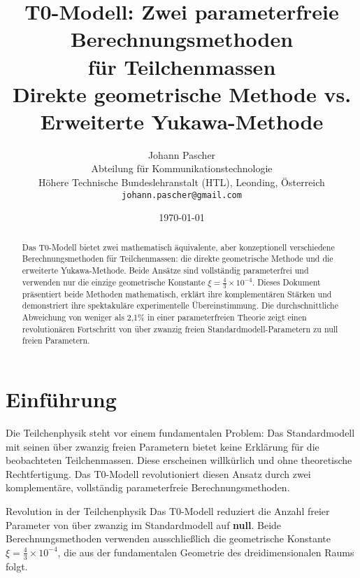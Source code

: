 \documentclass[12pt,a4paper]{article}
\newcommand{\xipar}{\xi}
\begin{document}
	
	\title{T0-Modell: Zwei parameterfreie Berechnungsmethoden \\
		für Teilchenmassen \\
		\large Direkte geometrische Methode vs. Erweiterte Yukawa-Methode}
	\author{Johann Pascher\\
		Abteilung für Kommunikationstechnologie\\
		Höhere Technische Bundeslehranstalt (HTL), Leonding, Österreich\\
		\texttt{johann.pascher@gmail.com}}
	\date{\today}
	
	\maketitle
	
	\begin{abstract}
		Das T0-Modell bietet zwei mathematisch äquivalente, aber konzeptionell verschiedene Berechnungsmethoden für Teilchenmassen: die direkte geometrische Methode und die erweiterte Yukawa-Methode. Beide Ansätze sind vollständig parameterfrei und verwenden nur die einzige geometrische Konstante $\xipar = \frac{4}{3} \times 10^{-4}$. Dieses Dokument präsentiert beide Methoden mathematisch, erklärt ihre komplementären Stärken und demonstriert ihre spektakuläre experimentelle Übereinstimmung. Die durchschnittliche Abweichung von weniger als 2,1\% in einer parameterfreien Theorie zeigt einen revolutionären Fortschritt von über zwanzig freien Standardmodell-Parametern zu null freien Parametern.
	\end{abstract}
	
	\tableofcontents
	\newpage
	
	\section{Einführung}
	\label{sec:introduction}
	
	Die Teilchenphysik steht vor einem fundamentalen Problem: Das Standardmodell mit seinen über zwanzig freien Parametern bietet keine Erklärung für die beobachteten Teilchenmassen. Diese erscheinen willkürlich und ohne theoretische Rechtfertigung. Das T0-Modell revolutioniert diesen Ansatz durch zwei komplementäre, vollständig parameterfreie Berechnungsmethoden.
	
	\begin{important}{Revolution in der Teilchenphysik}{}
		Das T0-Modell reduziert die Anzahl freier Parameter von über zwanzig im Standardmodell auf \textbf{null}. Beide Berechnungsmethoden verwenden ausschließlich die geometrische Konstante $\xipar = \frac{4}{3} \times 10^{-4}$, die aus der fundamentalen Geometrie des dreidimensionalen Raums folgt.
	\end{important}
	
\end{document}
